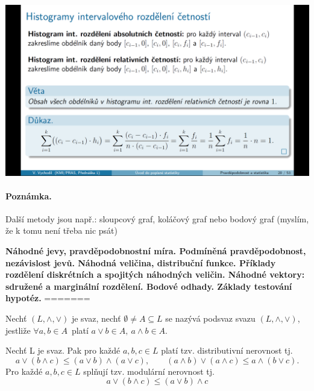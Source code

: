\begin{center}
	\includegraphics[scale=0.32]{img/graficke_metody_intervalove_rozdeleni_histogramy}
\end{center}
\paragraph{Poznámka.} Další metody jsou např.: sloupcový graf, koláčový graf nebo bodový graf (myslím, že k tomu není třeba nic psát)



\newpage
\textbf{Náhodné jevy, pravděpodobnostní míra. Podmíněná pravděpodobnost, nezávislost jevů. Náhodná veličina, distribuční
funkce. Příklady rozdělení diskrétních a spojitých náhodných veličin. Náhodné vektory: sdružené a
marginální rozdělení. Bodové odhady. Základy testování hypotéz.}
=======

\begin{definition}
	Nechť $(L, \wedge, \vee)$ je svaz, nechť $\emptyset \not= A \subseteq L$ se nazývá podsvaz svazu 
	$(L, \wedge, \vee)$, jestliže $\forall a,b \in A$ platí $a \vee b \in A,\ a \wedge b \in A$.
\end{definition}

\begin{sentence}
	Nechť L je svaz. Pak pro každé $a,b,c \in L$ platí tzv. distributivní nerovnost tj. $$a \vee (b \wedge c) \leq (a \vee b) \wedge (a \vee c), \qquad (a \wedge b) \vee (a \wedge c) \leq a \wedge (b \vee c).$$
	Pro každé $a,b,c \in L$ splňují tzv. modulární nerovnost tj. $$a \vee (b \wedge c) \leq (a \vee b) \wedge c$$
\end{sentence}

